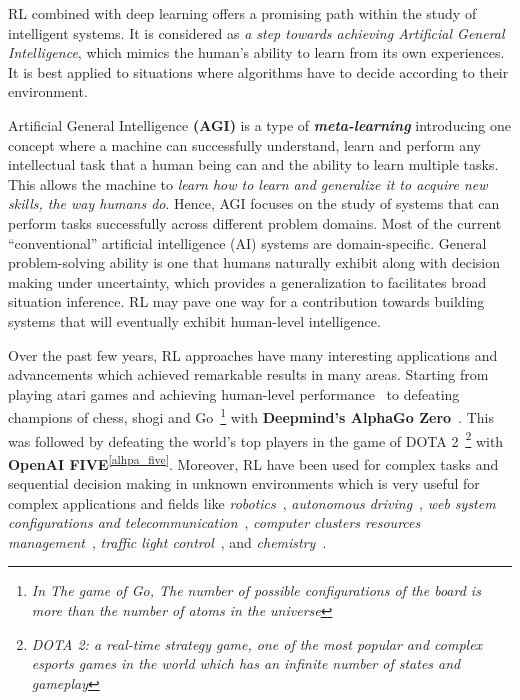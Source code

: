 

RL combined with deep learning offers a promising path within the study of intelligent systems. It is considered as \textit{a step towards achieving Artificial General Intelligence}, which mimics the human's ability to learn from its own experiences. It is best applied to situations where algorithms have to decide according to their environment.

Artificial General Intelligence \textbf{(AGI)} is a type of \textit{\textbf{meta-learning}} introducing one concept where a machine can successfully understand, learn and perform any intellectual task that a human being can and the ability to learn multiple tasks. This allows the machine to \textit{learn how to learn and generalize it to acquire new skills, the way humans do}. Hence, AGI focuses on the study of systems that can perform tasks successfully across different problem domains. Most of the current ``conventional'' artificial intelligence (AI) systems are domain-specific. General problem-solving ability is one that humans naturally exhibit along with decision making under uncertainty, which provides a generalization to facilitates broad situation inference. RL may pave one way for a contribution towards building systems that will eventually exhibit human-level intelligence.

Over the past few years, RL approaches have many interesting applications and advancements which achieved remarkable results in many areas. Starting from playing atari games and achieving human-level performance~\parencite{mnih2015human} to defeating champions of chess, shogi and Go~\footnote{\textit{In The game of Go, The number of possible configurations of the board is more than the number of atoms in the universe}} with \textbf{Deepmind's AlphaGo Zero}~\parencite{silver2017mastering}. This was followed by defeating the world's top players in the game of DOTA 2~\footnote{\textit{DOTA 2: a real-time strategy game, one of the most popular and complex esports games in the world which has an infinite number of states and gameplay}} with \textbf{OpenAI FIVE}\textsuperscript{\ref{alhpa_five}}. Moreover, RL have been used for complex tasks and sequential decision making in unknown environments which is very useful for complex applications and fields like \textit{robotics}~\parencite{kober2013reinforcement, levine2016end, gu2017deep, singh2019end}, \textit{autonomous driving}~\parencite{sallab2017deep, xu2018zero}, \textit{web system configurations and telecommunication}~\parencite{bu2009reinforcement}, \textit{computer clusters resources management}~\parencite{mao2016resource}, \textit{traffic light control}~\parencite{arel2010reinforcement}, and \textit{chemistry}~\parencite{zhou2017optimizing}.

